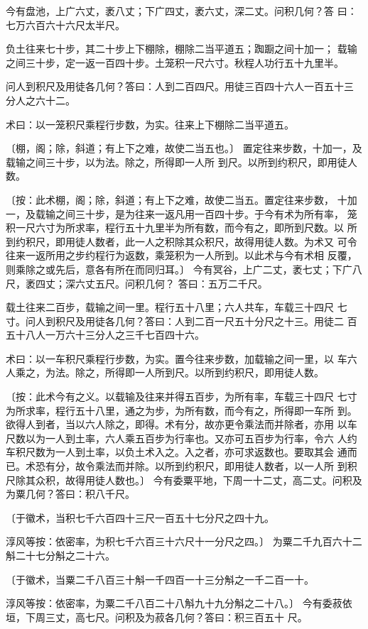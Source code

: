 \documentclass[a4paper,12pt,UTF8,twoside]{ctexbook}
\begin{document}
今有盘池，上广六丈，袤八丈；下广四丈，袤六丈，深二丈。问积几何？答 曰：七万六百六十六尺太半尺。

负土往来七十步，其二十步上下棚除，棚除二当平道五；踟蹰之间十加一； 载输之间三十步，定一返一百四十步。土笼积一尺六寸。秋程人功行五十九里半。

问人到积尺及用徒各几何？答曰：人到二百四尺。用徒三百四十六人一百五十三 分人之六十二。

术曰：以一笼积尺乘程行步数，为实。往来上下棚除二当平道五。

〔棚，阁；除，斜道；有上下之难，故使二当五也。〕 置定往来步数，十加一，及载输之间三十步，以为法。除之，所得即一人所 到尺。以所到约积尺，即用徒人数。

〔按：此术棚，阁；除，斜道；有上下之难，故使二当五。置定往来步数， 十加一，及载输之间三十步，是为往来一返凡用一百四十步。于今有术为所有率， 笼积一尺六寸为所求率，程行五十九里半为所有数，而今有之，即所到尺数。以 所到约积尺，即用徒人数者，此一人之积除其众积尺，故得用徒人数。为术又 可令往来一返所用之步约程行为返数，乘笼积为一人所到。以此术与今有术相 反覆，则乘除之或先后，意各有所在而同归耳。〕 今有冥谷，上广二丈，袤七丈；下广八尺，袤四丈；深六丈五尺。问积几何？ 答曰：五万二千尺。

载土往来二百步，载输之间一里。程行五十八里；六人共车，车载三十四尺 七寸。问人到积尺及用徒各几何？答曰：人到二百一尺五十分尺之十三。用徒二 百五十八人一万六十三分人之三千七百四十六。

术曰：以一车积尺乘程行步数，为实。置今往来步数，加载输之间一里，以 车六人乘之，为法。除之，所得即一人所到尺。以所到约积尺，即用徒人数。

〔按：此术今有之义。以载输及往来并得五百步，为所有率，车载三十四尺 七寸为所求率，程行五十八里，通之为步，为所有数，而今有之，所得即一车所 到。欲得人到者，当以六人除之，即得。术有分，故亦更令乘法而并除者，亦用 以车尺数以为一人到土率，六人乘五百步为行率也。又亦可五百步为行率，令六 人约车积尺数为一人到土率，以负土术入之。入之者，亦可求返数也。要取其会 通而已。术恐有分，故令乘法而并除。以所到约积尺，即用徒人数者，以一人所 到积尺除其众积，故得用徒人数也。〕 今有委粟平地，下周一十二丈，高二丈。问积及为粟几何？答曰：积八千尺。

〔于徽术，当积七千六百四十三尺一百五十七分尺之四十九。

淳风等按：依密率，为积七千六百三十六尺十一分尺之四。〕 为粟二千九百六十二斛二十七分斛之二十六。

〔于徽术，当粟二千八百三十斛一千四百一十三分斛之一千二百一十。

淳风等按：依密率，为粟二千八百二十八斛九十九分斛之二十八。〕 今有委菽依垣，下周三丈，高七尺。问积及为菽各几何？答曰：积三百五十 尺。
\end{document}
